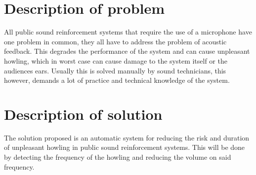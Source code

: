 \section{Description of problem}
All public sound reinforcement systems that require the use of a microphone have one problem in common, they all have to address the problem of acoustic feedback. This degrades the performance of the system and can cause unpleasant howling, which in worst case can cause damage to the system itself or the audiences ears. Usually this is solved manually by sound technicians, this however, demands a lot of practice and technical knowledge of the system. 
\section{Description of solution}
The solution proposed is an automatic system for reducing the risk and duration of unpleasant howling in public sound reinforcement systems. This will be done by detecting the frequency of the howling and reducing the volume on said frequency.
